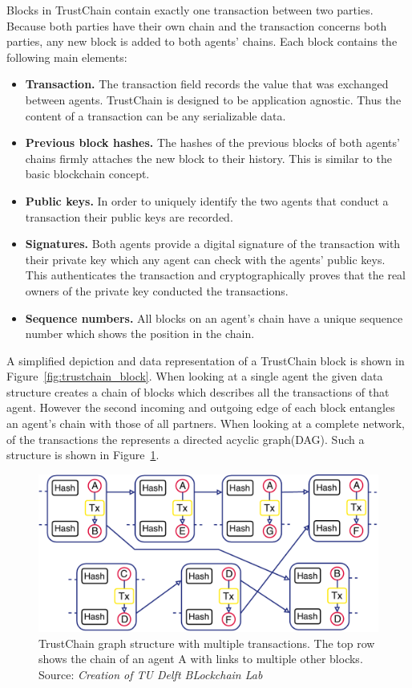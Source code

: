 Blocks in TrustChain contain exactly one transaction between two parties. Because both parties have 
their own chain and the transaction concerns both parties, any new block is added to both agents'
chains. Each block contains the following main elements:

\begin{itemize}
    \item \textbf{Transaction.} The transaction field records the value that was exchanged between agents.
    TrustChain is designed to be application agnostic. Thus the content of a transaction can be any 
    serializable data. 
    \item \textbf{Previous block hashes.} The hashes of the previous blocks of both agents' chains 
    firmly attaches the new block to their history. This is similar to the basic blockchain concept.
    \item \textbf{Public keys.} In order to uniquely identify the two agents that conduct a transaction
    their public keys are recorded.
    \item \textbf{Signatures.} Both agents provide a digital signature of the transaction with their 
    private key which any agent can check with the agents' public keys. This authenticates the 
    transaction and cryptographically proves that the real owners of the private key conducted the 
    transactions.
    \item \textbf{Sequence numbers.} All blocks on an agent's chain have a unique sequence number 
    which shows the position in the chain. 
\end{itemize}

A simplified depiction and data representation of a TrustChain block is shown in Figure~\ref{fig:trustchain_block}. When 
looking at a single agent the given data structure creates a chain of blocks which describes all the
transactions of that agent. However the second incoming and outgoing edge of each block entangles an
agent's chain with those of all partners. When looking at a complete network, of the transactions the
represents a directed acyclic graph(DAG). Such a structure is shown in Figure~\ref{fig:trustchain_graph}.

\begin{figure}
    \centering
    \includegraphics[width=\textwidth]{images/trustchain_graph.pdf}
    \caption{TrustChain graph structure with multiple transactions. The top row shows the chain of
    an agent A with links to multiple other blocks. Source: \textit{Creation of TU Delft BLockchain Lab}}
    \label{fig:trustchain_graph}
\end{figure}


